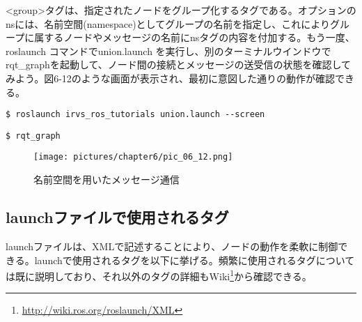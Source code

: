 <group>タグは、指定されたノードをグループ化するタグである。オプションのnsには、名前空間(namespace)としてグループの名前を指定し、これによりグループに属するノードやメッセージの名前にnsタグの内容を付加する。もう一度、roslaunch コマンドでunion.launch を実行し、別のターミナルウインドウでrqt\_graphを起動して、ノード間の接続とメッセージの送受信の状態を確認してみよう。図6-12のような画面が表示され、最初に意図した通りの動作が確認できる。

\begin{lstlisting}[language=ROS]
$ roslaunch irvs_ros_tutorials union.launch --screen
\end{lstlisting}

\begin{lstlisting}[language=ROS]
$ rqt_graph
\end{lstlisting}

\begin{figure}[h]
  \centering
  \texttt{[image: pictures/chapter6/pic\_06\_12.png]}
  \caption{名前空間を用いたメッセージ通信}
\end{figure}

\subsection{launchファイルで使用されるタグ}

launchファイルは、XMLで記述することにより、ノードの動作を柔軟に制御できる。launchで使用されるタグを以下に挙げる。頻繁に使用されるタグについては既に説明しており、それ以外のタグの詳細もWiki\footnote{\url{http://wiki.ros.org/roslaunch/XML}}から確認できる。


